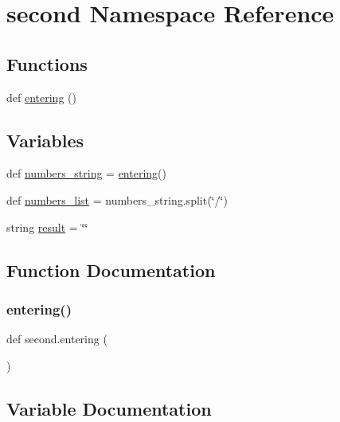 \hypertarget{namespacesecond}{}\section{second Namespace Reference}
\label{namespacesecond}
\subsection*{Functions}
\begin{DoxyCompactItemize}
\item 
def \hyperlink{namespacesecond_a4dff772c3e7049d2edb57b657c78e37d}{entering} ()
\end{DoxyCompactItemize}
\subsection*{Variables}
\begin{DoxyCompactItemize}
\item 
def \hyperlink{namespacesecond_ac5dc13845221bc80b81590edab25f75f}{numbers\+\_\+string} = \hyperlink{namespacesecond_a4dff772c3e7049d2edb57b657c78e37d}{entering}()
\item 
def \hyperlink{namespacesecond_af2098209ef8f5c6d6383458e3a2ae028}{numbers\+\_\+list} = numbers\+\_\+string.\+split(\char`\"{}/\char`\"{})
\item 
string \hyperlink{namespacesecond_a46a3d46a5525f7e7967e489a663b1236}{result} = \char`\"{}\char`\"{}
\end{DoxyCompactItemize}


\subsection{Function Documentation}
\mbox{\label{namespacesecond_a4dff772c3e7049d2edb57b657c78e37d}} 
\subsubsection{\texorpdfstring{entering()}{entering()}}
{\footnotesize\ttfamily def second.\+entering (\begin{DoxyParamCaption}{ }\end{DoxyParamCaption})}



\subsection{Variable Documentation}
\mbox{\label{namespacesecond_af2098209ef8f5c6d6383458e3a2ae028}} 
